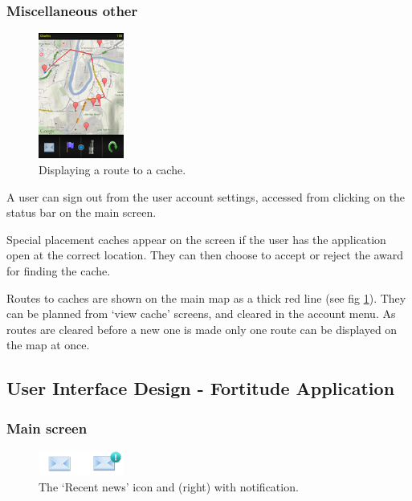 \subsubsection{Miscellaneous other}

\begin{figure}
	\vspace{-60pt}
	\begin{center}
	\includegraphics[width=0.25\textwidth]{images/route_mapping}
	\caption{Displaying a route to a cache.}
	\label{route_mapping}
	\end{center}
	\vspace{-30pt}
\end{figure}

A user can sign out from the user account settings, accessed from clicking on the status bar on the main screen.

Special placement caches appear on the screen if the user has the application open at the correct location. They can then choose to accept or reject the award for finding the cache.

Routes to caches are shown on the main map as a thick red line (see fig \ref{route_mapping}). They can be planned from `view cache' screens, and cleared in the account menu. As routes are cleared before a new one is made only one route can be displayed on the map at once.
\vspace{30pt}

\subsection{User Interface Design - Fortitude Application}

\subsubsection{Main screen}

\begin{figure}
	\vspace{-20pt}
	\begin{center}
	\includegraphics[width=0.25\textwidth]{images/news_icons}
	\caption{The `Recent news' icon and (right) with notification.}
	\label{news_icons}
	\end{center}
	\vspace{-20pt}
\end{figure}

